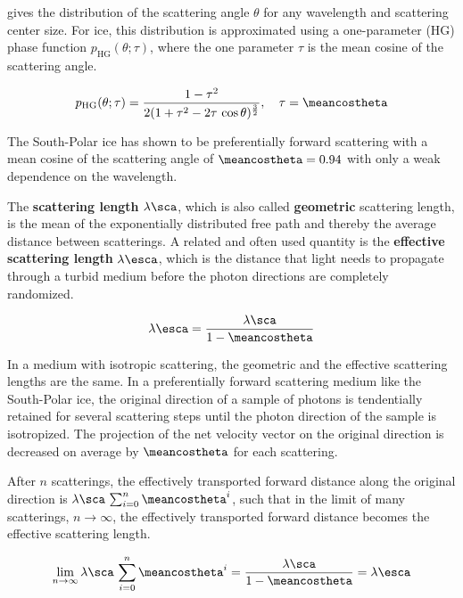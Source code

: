 gives the distribution of the scattering angle $\theta$ for any wavelength and scattering center size. For ice, this distribution is approximated using a one-parameter  (HG) phase function $p_\text{HG}(\theta; \tau)$, where the one parameter $\tau$ is the mean cosine of the scattering angle. \cite{lundberg}

$$ p_\text{HG}(\theta; \tau) = \frac{1 - \tau^2}{2(1 + \tau^2 - 2\tau\, \cos \theta)^\frac{3}{2}}, \ \ \ \tau = \meancostheta $$

The South-Polar ice has shown to be preferentially forward scattering with a mean cosine of the scattering angle of $\meancostheta = 0.94$ with only a weak dependence on the wavelength. \cite{ackermann}

The \textbf{scattering length} $\lambda\sca$, which is also called \textbf{geometric} scattering length, is the mean of the exponentially distributed free path and thereby the average distance between scatterings. \cite{ackermann}
A related and often used quantity is the \textbf{effective scattering length} $\lambda\esca$, which is the distance that light needs to propagate through a turbid medium before the photon directions are completely randomized. \cite{lundberg}

\begin{equation}
  \lambda\esca = \frac{\lambda\sca}{1 - \meancostheta}
\end{equation}

In a medium with isotropic scattering, the geometric and the effective scattering lengths are the same. In a preferentially forward scattering medium like the South-Polar ice, the original direction of a sample of photons is tendentially retained for several scattering steps until the photon direction of the sample is isotropized. The projection of the net velocity vector on the original direction is decreased on average by $\meancostheta$ for each scattering. \cite{lundberg}

After $n$ scatterings, the effectively transported forward distance along the original direction is $\lambda\sca\,\sum_{i=0}^n \meancostheta^i$, such that in the limit of many scatterings, $n \rightarrow \infty$, the effectively transported forward distance becomes the effective scattering length. \cite{lundberg, ackermann}

$$ \lim_{n \rightarrow \infty} \lambda\sca\,\sum_{i=0}^n \meancostheta^i = \frac{\lambda\sca}{1 - \meancostheta} = \lambda\esca $$

